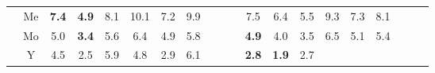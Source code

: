 \documentclass[french,10pt]{article}
\begin{document}
\begin{landscape}
\begin{longtable}{ l  c | c c c | c c c | c c c | c c c | c c c | c c c | }
                    \\*
                        & {\small Me  }

                    &                     \textbf{ 7.4}
     & {\footnotesize     \textbf{ 4.9}
    } & {\footnotesize     8.1
     }
    
    
                    &                     10.1
     & {\footnotesize     7.2
    } & {\footnotesize     9.9
     }
    
    
                    & & &

                    &                     7.5
     & {\footnotesize     6.4
    } & {\footnotesize     5.5
     }
    
    
                    &                     9.3
     & {\footnotesize     7.3
    } & {\footnotesize     8.1
     }
    
    
                    & & &

                    \\*
                        & {\small Mo  }

                    &                     5.0
     & {\footnotesize     \textbf{ 3.4}
    } & {\footnotesize     5.6
     }
    
    
                    &                     6.4
     & {\footnotesize     4.9
    } & {\footnotesize     5.8
     }
    
    
                    & & &

                    &                     \textbf{ 4.9}
     & {\footnotesize     4.0
    } & {\footnotesize     3.5
     }
    
    
                    &                     6.5
     & {\footnotesize     5.1
    } & {\footnotesize     5.4
     }
    
    
                    & & &

                    \\*
                        & {\small Y  }

                    &                     4.5
     & {\footnotesize     2.5
    } & {\footnotesize     5.9
     }
    
    
                    &                     4.8
     & {\footnotesize     2.9
    } & {\footnotesize     6.1
     }
    
    
                    & & &

                    &                     \textbf{ 2.8}
     & {\footnotesize     \textbf{ 1.9}
    } & {\footnotesize     2.7
     }
    

\end{longtable}
\end{landscape}
\end{document}
